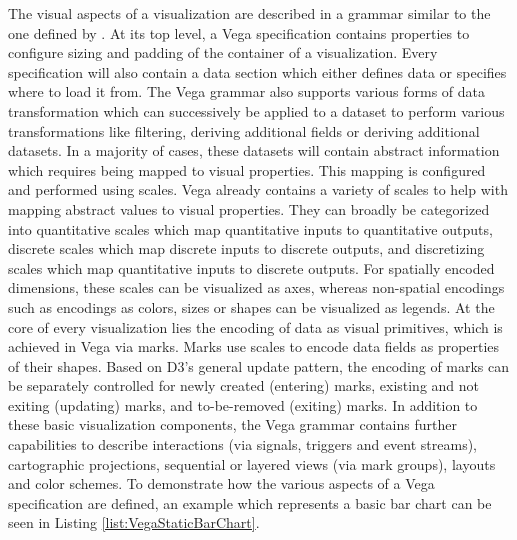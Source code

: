 The visual aspects of a visualization are described in a grammar similar to the one defined by \cite{GrammarOfGraphics}.
At its top level, a Vega specification contains properties to configure sizing and padding of the container of a visualization.
Every specification will also contain a data section which either defines data or specifies where to load it from.
The Vega grammar also supports various forms of data transformation which can successively be applied to a dataset to perform various transformations like filtering, deriving additional fields or deriving additional datasets.
In a majority of cases, these datasets will contain abstract information which requires being mapped to visual properties.
This mapping is configured and performed using scales.
Vega already contains a variety of scales to help with mapping abstract values to visual properties.
They can broadly be categorized into quantitative scales which map quantitative inputs to quantitative outputs, discrete scales which map discrete inputs to discrete outputs, and discretizing scales which map quantitative inputs to discrete outputs.
For spatially encoded dimensions, these scales can be visualized as axes, whereas non-spatial encodings such as encodings as colors, sizes or shapes can be visualized as legends.
At the core of every visualization lies the encoding of data as visual primitives, which is achieved in Vega via marks.
Marks use scales to encode data fields as properties of their shapes.
Based on D3's general update pattern, the encoding of marks can be separately controlled for newly created (entering) marks, existing and not exiting (updating) marks, and to-be-removed (exiting) marks.
In addition to these basic visualization components, the Vega grammar contains further capabilities to describe interactions (via signals, triggers and event streams), cartographic projections, sequential or layered views (via mark groups), layouts and color schemes.
To demonstrate how the various aspects of a Vega specification are defined, an example which represents a basic bar chart can be seen in Listing \ref{list:VegaStaticBarChart}.

\begin{samepage}
 
    The Vega specification of a static bar chart.
    Demonstrates the principle of data, scales, axes and marks.
  },
]{listings/vega-static-bar-chart.json}
\end{samepage}

